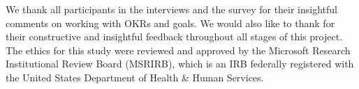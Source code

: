 \documentclass[sigconf, nonacm]{acmart}
\begin{document}
%
\begin{acks}
We thank all participants in the interviews and the survey for their insightful comments on working with OKRs and goals.
We would also like to thank  for their constructive and insightful feedback throughout all stages of this project.
The ethics for this study were reviewed and approved by the Microsoft Research Institutional Review Board (MSRIRB), which is an IRB federally registered with the United States Department of Health \& Human Services. 
\end{acks}

%



% 
\end{document}
